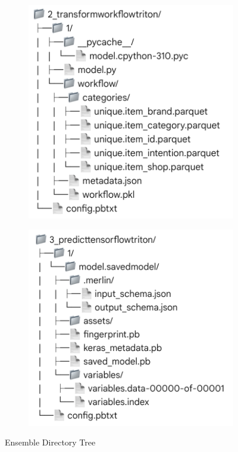 \begin{figure}[H]
\begin{subfigure}{.3\textwidth}
        \label{fig:Ensemble3}
    \end{subfigure}
    \begin{subfigure}{.3\textwidth}
        \centering
        \includegraphics[width=\textwidth]{assets/ensemble_4.png}
        \label{fig:Ensemble4}
    \end{subfigure}
    \begin{subfigure}{.3\textwidth}
        \centering
        \includegraphics[width=\textwidth]{assets/ensemble_5.png}
        \label{fig:Ensemble5}
    \end{subfigure}
    \caption{Ensemble Directory Tree}
    \label{fig: EnsembleDirectoryTree}
\end{figure}


